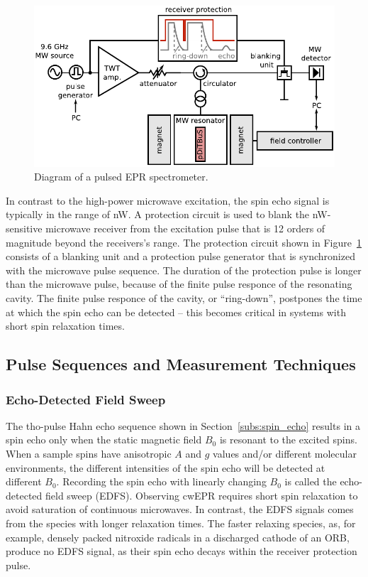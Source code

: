 \begin{figure}[h]
\center
	\includegraphics[width=1\textwidth]{./pulse/figures/pEPR_spectrometer_diagram.pdf}
	\caption{Diagram of a pulsed EPR spectrometer.}
	\label{fig:pepr_spectrometer_diagram}
\end{figure}

In contrast to the high-power microwave excitation, the spin echo signal is typically in the range of nW. A protection circuit is used to blank the nW-sensitive microwave receiver from the excitation pulse that is 12 orders of magnitude beyond the receivers's range. The protection circuit shown in Figure~\ref{fig:pepr_spectrometer_diagram} consists of a blanking unit and a protection pulse generator that is synchronized with the microwave pulse sequence. The duration of the protection pulse is longer than the microwave pulse, because of the finite pulse responce of the resonating cavity. The finite pulse responce of the cavity, or ``ring-down'', postpones the time at which the spin echo can be detected -- this becomes critical in systems with short spin relaxation times.

\subsection{Pulse Sequences and Measurement Techniques}
\subsubsection{Echo-Detected Field Sweep}
The tho-pulse Hahn echo sequence shown in Section~\ref{subs:spin_echo} results in a spin echo only when the static magnetic field $B_0$ is resonant to the excited spins. When a sample spins have anisotropic $A$ and $g$ values and/or different molecular environments, the different intensities of the spin echo will be detected at different $B_0$. Recording the spin echo with linearly changing $B_0$ is called the echo-detected field sweep (EDFS). Observing cwEPR requires short spin relaxation to avoid saturation of continuous microwaves. In contrast, the EDFS signals comes from the species with longer relaxation times. The faster relaxing species, as, for example, densely packed nitroxide radicals in a discharged cathode of an ORB, produce no EDFS signal, as their spin echo decays within the receiver protection pulse.

